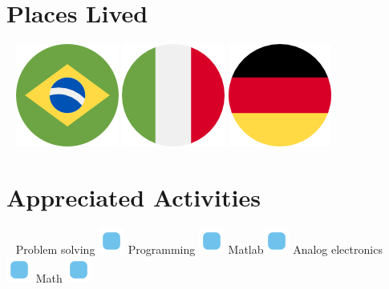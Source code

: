 \documentclass[]{friggeri-cv}
\begin{document}
\begin{aside}
	\section{Places Lived}
		~
		\includegraphics[scale=0.03]{img/brazil.png}    \includegraphics[scale=0.03]{img/italy.png}   \includegraphics[scale=0.03]{img/germany.png}
    	~
    \section{Appreciated Activities}
    	~
	    Problem solving \includegraphics[scale=0.40]{img/point.png}
	    Programming \includegraphics[scale=0.40]{img/point.png}
	    Matlab\includegraphics[scale=0.40]{img/point.png}
	    Analog electronics \includegraphics[scale=0.40]{img/point.png}
	    Math \includegraphics[scale=0.40]{img/point.png}
	    ~ 
\end{aside}
~
\\
\end{document}
